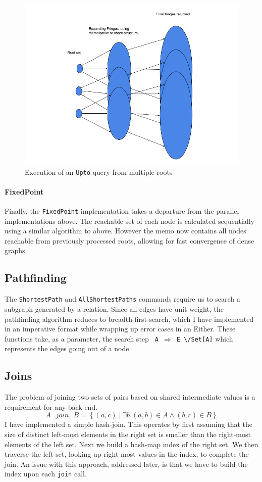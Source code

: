 \documentclass[12pt,a4paper,twoside,openright]{report}
\newcommand\codeName[1]{\texttt{#1}}
\newcommand\either[0]{\textbackslash/}
\newcommand{\setComp}[2]{\left\lbrace #1 \mid #2 \right\rbrace}
\let\oldparagraph\paragraph
\renewcommand{\paragraph}[1]{\oldparagraph{#1}\mbox{}}
\begin{document}
\begin{figure}[ht]
\centering
  \includegraphics[width=\textwidth]{figs/UptoPairs.png}
  \caption{Execution of an \codeName{Upto} query from multiple roots}
  \label{fig:UptoPairs}
\end{figure}
		
		\paragraph{FixedPoint}
Finally, the \codeName{FixedPoint} implementation takes a departure from the parallel implementations above. The reachable set of each node is calculated sequentially using a similar algorithm to above. However the memo now contains all nodes reachable from previously processed roots, allowing for fast convergence of dense graphs.	
	
	\subsection{Pathfinding}
	The \codeName{ShortestPath} and \codeName{AllShortestPaths} commands require us to search a subgraph generated by a relation. Since all edges have unit weight, the pathfinding algorithm reduces to breadth-first-search, which I have implemented in an imperative format while wrapping up error cases in an Either. These functions take, as a parameter, the search step \codeName{ A\ $\Rightarrow$ E \either Set[A]} which represents the edges going out of a node. 
	
	\subsection{Joins}
	The problem of joining two sets of pairs based on shared intermediate values is a requirement for any back-end. 
\[
A\mbox{ }join\mbox{ }B = \setComp{(a, c)}{\exists b. (a, b) \in A \wedge (b, c) \in B}
\]	
I have implemented a simple hash-join\cite{HashJoins}. This operates by first assuming that the size of distinct left-most elements in the right set is smaller than the right-most elements of the left set. Next we build a hash-map index of the right set. We then traverse the left set, looking up right-most-values in the index, to complete the join. An issue with this approach, addressed later, is that we have to build the index upon each \codeName{join} call.
\end{document}
